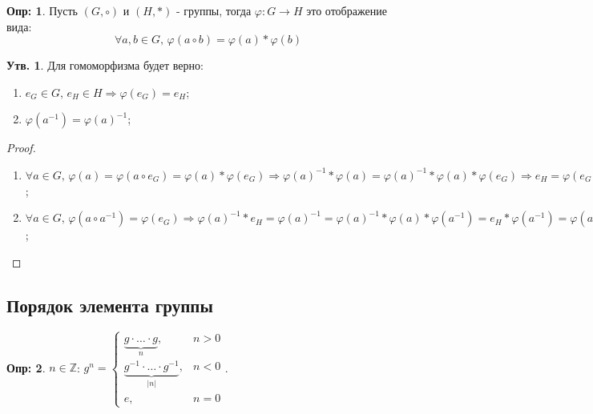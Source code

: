 \documentclass[12pt]{article}
\newcommand{\MZ}{\mathbb{Z}}
\theoremstyle{definition}
\newtheorem{defn}{Опр:}
\newtheorem{prop}{Утв.}
\begin{document}
\begin{defn}
	Пусть $(G, \circ)$ и $(H, *)$ - группы, тогда  $\varphi \colon G \to H$ это отображение вида:
	$$
		\forall a,b \in G, \, \varphi(a\circ b) = \varphi(a)*\varphi(b)
	$$
\end{defn}
\begin{prop}
	Для гомоморфизма будет верно:
	\begin{enumerate}[label=\arabic*)]
		\item $e_G \in G, \, e_H \in H \Rightarrow \varphi(e_G) = e_H$;
		\item $\varphi(a^{-1}) = \varphi(a)^{-1}$;
	\end{enumerate}
\end{prop}
\begin{proof}\hfill
	\begin{enumerate}[label=\arabic*)]
		\item $\forall a \in G, \, \varphi(a) = \varphi(a\circ e_G) = \varphi(a)*\varphi(e_G) \Rightarrow \varphi(a)^{-1}*\varphi(a) = \varphi(a)^{-1}*\varphi(a)*\varphi(e_G) \Rightarrow e_H = \varphi(e_G)$;
		\item $\forall a \in G, \, \varphi(a \circ a^{-1}) = \varphi(e_G) \Rightarrow \varphi(a)^{-1}*e_H = \varphi(a)^{-1}= \varphi(a)^{-1}*\varphi(a)*\varphi(a^{-1}) = e_H*\varphi(a^{-1}) = \varphi(a^{-1})$;
	\end{enumerate}
\end{proof}

\subsection*{Порядок элемента группы}

\begin{defn}
	 $n \in \MZ$: $g^n = 
		\begin{cases}
			\underbrace{g{\cdot}\dotsc{\cdot}g}_{n}, & n > 0\\
			\underbrace{g^{-1}{\cdot}\dotsc{\cdot}g^{-1}}_{|n|}, & n < 0\\
			e, & n = 0
		\end{cases}$.
\end{defn}
\end{document}
